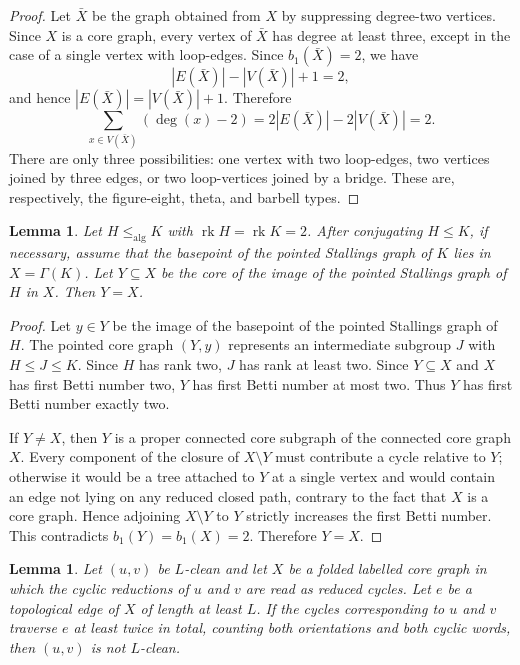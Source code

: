 \documentclass{amsproc}
\newtheorem{lemma}[theorem]{Lemma}
\begin{document}
\begin{proof}
Let \(\bar X\) be the graph obtained from \(X\) by suppressing degree-two
vertices.  Since \(X\) is a core graph, every vertex of \(\bar X\) has
degree at least three, except in the case of a single vertex with loop-edges.
Since \(b_1(\bar X)=2\), we have
\[
        |E(\bar X)|-|V(\bar X)|+1=2,
\]
and hence \(|E(\bar X)|=|V(\bar X)|+1\).  Therefore
\[
        \sum_{x\in V(\bar X)}(\deg(x)-2)
        =
        2|E(\bar X)|-2|V(\bar X)|
        =
        2.
\]
There are only three possibilities: one vertex with two loop-edges, two vertices
joined by three edges, or two loop-vertices joined by a bridge.  These are,
respectively, the figure-eight, theta, and barbell types.
\end{proof}

\begin{lemma}\label{lem:core-image-fills}
Let \(H\leq_{\mathrm{alg}} K\) with \(\operatorname{rk} H=\operatorname{rk} K=2\).
After conjugating \(H\leq K\), if necessary, assume that the basepoint of the
pointed Stallings graph of \(K\) lies in \(X=\Gamma(K)\).  Let \(Y\subseteq X\)
be the core of the image of the pointed Stallings graph of \(H\) in \(X\).  Then
\(Y=X\).
\end{lemma}

\begin{proof}
Let \(y\in Y\) be the image of the basepoint of the pointed Stallings graph of
\(H\).  The pointed core graph \((Y,y)\) represents an intermediate subgroup
\(J\) with
$
        H\leq J\leq K .
$
Since \(H\) has rank two, \(J\) has rank at least two.  Since \(Y\subseteq X\)
and \(X\) has first Betti number two, \(Y\) has first Betti number at most two.
Thus \(Y\) has first Betti number exactly two.

If \(Y\neq X\), then \(Y\) is a proper connected core subgraph of the connected
core graph \(X\).  Every component of the closure of \(X\setminus Y\) must
contribute a cycle relative to \(Y\); otherwise it would be a tree attached to
\(Y\) at a single vertex and would contain an edge not lying on any reduced
closed path, contrary to the fact that \(X\) is a core graph.  Hence adjoining
\(X\setminus Y\) to \(Y\) strictly increases the first Betti number.  This
contradicts \(b_1(Y)=b_1(X)=2\).  Therefore \(Y=X\).
\end{proof}

\begin{lemma} \label{lem:edge-traversal}
Let $(u,v)$ be $L$-clean and let $X$ be a folded labelled core graph in which
the cyclic reductions of $u$ and $v$ are read as reduced cycles.  Let $e$
be a topological edge of $X$ of length at least $L$.  If the cycles
corresponding to $u$ and $v$ traverse $e$ at least twice in total, counting
both orientations and both cyclic words, then $(u,v)$ is not $L$-clean.
\end{lemma}
\end{document}
